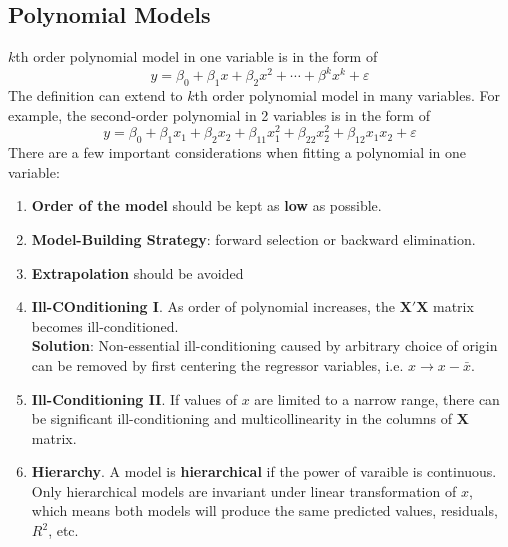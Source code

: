 \documentclass[11pt]{article}
\theoremstyle{definition}
\begin{document}
\subsection{Polynomial Models}
$k$th order polynomial model in one variable is in the form of
\[
y=\beta_0+\beta_1x+\beta_2x^2+\cdots+\beta^kx^k+\varepsilon
\]
The definition can extend to $k$th order polynomial model in many variables. For example, the second-order polynomial in 2 variables is in the form of
\[
y=\beta_0+\beta_1x_1+\beta_2x_2+\beta_{11}x_1^2+\beta_{22}x_2^2+\beta_{12}x_1x_2+\varepsilon
\]
There are a few important considerations when fitting a polynomial in one variable:
\begin{enumerate}
  \item \textbf{Order of the model} should be kept as \textbf{low} as possible.
  \item \textbf{Model-Building Strategy}: forward selection or backward elimination.
  \item \textbf{Extrapolation} should be avoided
  \item \textbf{Ill-COnditioning I}. As order of polynomial increases, the $\bm{X}'\bm{X}$ matrix becomes ill-conditioned.\\\textbf{Solution}: Non-essential ill-conditioning caused by arbitrary choice of origin can be removed by first centering the regressor variables, i.e. $x\to x-\bar{x}$.
  \item \textbf{Ill-Conditioning II}. If values of $x$ are limited to a narrow range, there can be significant ill-conditioning and multicollinearity in the columns of $\bm{X}$ matrix.
  \item \textbf{Hierarchy}. A model is \textbf{hierarchical} if the power of varaible is continuous.\\Only hierarchical models are invariant under linear transformation of $x$, which means both models will produce the same predicted values, residuals, $R^2$, etc.
\end{enumerate}
\end{document}
